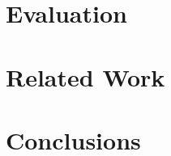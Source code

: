 \documentclass{sigplanconf}
\begin{document}

\section{Evaluation}
\label{sec:Evaluation}


\section{Related Work}
\label{sec:related}

\section{Conclusions}
\label{sec:conclusions}



\end{document}
